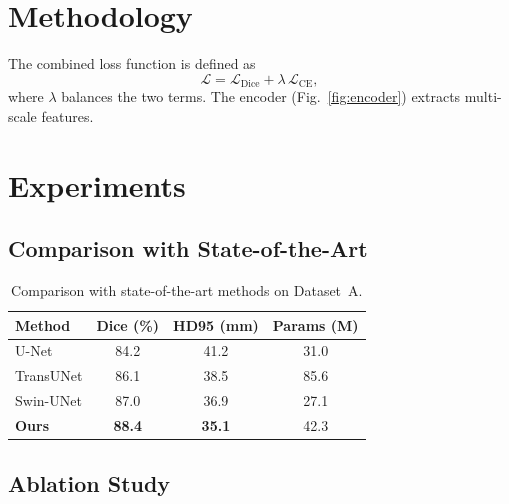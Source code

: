 \documentclass[journal,twocolumn]{IEEEtran}   %
\begin{document}
\section{Methodology}
The combined loss function is defined as
\begin{equation}
\mathcal{L} = \mathcal{L}_{\text{Dice}} + \lambda\,\mathcal{L}_{\text{CE}},
\label{eq:loss}
\end{equation}
where $\lambda$ balances the two terms.
The encoder (Fig.~\ref{fig:encoder}) extracts multi-scale features.
\lipsum[4-5]

\section{Experiments}

\subsection{Comparison with State-of-the-Art}
\lipsum[6]

\begin{table}[htbp]
\centering
\caption{Comparison with state-of-the-art methods on Dataset~A.}
\label{tab:sota}
\begin{tabular}{lccc}
\toprule
Method         & Dice (\%)     & HD95 (mm)     & Params (M) \\
\midrule
U-Net          & 84.2          & 41.2          & 31.0       \\
TransUNet      & 86.1          & 38.5          & 85.6       \\
Swin-UNet      & 87.0          & 36.9          & 27.1       \\
\textbf{Ours}  & \textbf{88.4} & \textbf{35.1} & 42.3       \\
\bottomrule
\end{tabular}
\end{table}

\subsection{Ablation Study}
\lipsum[7]
\end{document}
